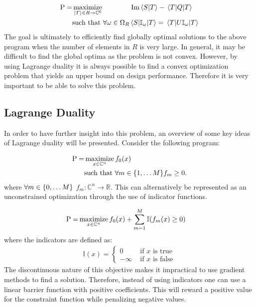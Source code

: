 \documentclass[twocolumn]{revtex4-2}
\DeclareMathOperator*{\maximize}{maximize}
\begin{document}
\begin{align}
	\label{eq:opt_exact}
	\text{P}=&\maximize_{\ket{T}\in R\rightarrow\mathbb{C}^6}\qquad\qquad \Im\braket{S}{T} - \ev{Q}{T}\\
	&\text{such that } \forall \omega\in\Omega_R \mel{S}{\mathbb{I}_\omega}{T} = \ev{U\mathbb{I}_\omega}{T}\nonumber
\end{align}
The goal is ultimately to efficiently find globally optimal solutions to the above program when the number of elements in $R$ is very large. In general, it may be difficult to find the global optima as the problem is not convex. However, by using Lagrange duality it is always possible to find a convex optimization problem that yields an upper bound on design performance. Therefore it is very important to be able to solve this problem.

\subsection{Lagrange Duality}
\label{sec:lagrange_duality}
In order to have further insight into this problem, an overview of some key ideas of Lagrange duality will be presented. Consider the following program:

\begin{align}
	\label{eq:primal_general}
	\text{P}=&\maximize_{x\in\mathbb{C}^n} f_0(x)\\
	&\text{such that } \forall m\in\qty{1, \dots M}f_m\ge 0\nonumber.
\end{align}
where $\forall m\in\qty{0, \dots M}$ $f_m:\mathbb{C}^n\rightarrow\mathbb{R}$. This can alternatively be represented as an unconstrained optimization through the use of indicator functions.

\begin{align}
	\text{P}=&\maximize_{x\in\mathbb{C}^n} f_0(x) + \sum_{m=1}^M\mathbb{I}\qty(f_m(x)\ge 0)
\end{align}
where the indicators are defined as:
\begin{align}
	\mathbb{I}(x) = \begin{cases}0 &\text{ if $x$ is true}\\-\infty &\text{ if $x$ is false}\end{cases}
\end{align}
The discontinuous nature of this objective makes it impractical to use gradient methods to find a solution. Therefore, instead of using indicators one can use a linear barrier function with positive coefficients. This will reward a positive value for the constraint function while penalizing negative values.
\end{document}
